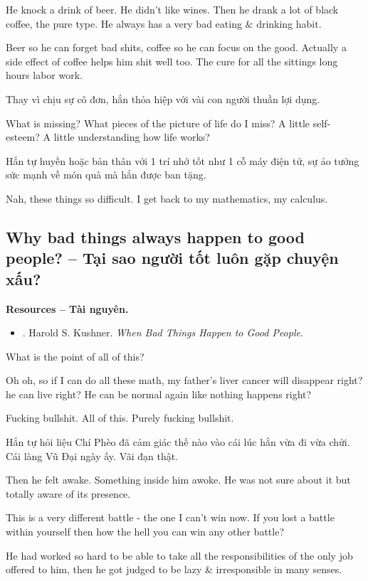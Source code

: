 \documentclass[12pt]{article}
\begin{document}
He knock a drink of beer. He didn't like wines. Then he drank a lot of black coffee, the pure type. He always has a very bad eating \& drinking habit.

Beer so he can forget bad shits, coffee so he can focus on the good. Actually a side effect of coffee helps him shit well too. The cure for all the sittings long hours labor work.

Thay vì chịu sự cô đơn, hắn thỏa hiệp với vài con người thuần lợi dụng. 

What is missing? What pieces of the picture of life do I miss? A little self-esteem? A little understanding how life works?

Hắn tự huyền hoặc bản thân với 1 trí nhớ tốt như 1 cỗ máy điện tử, sự ảo tưởng sức mạnh về món quà mà hắn được ban tặng.

Nah, these things so difficult. I get back to my mathematics, my calculus.

\subsection{Why bad things always happen to good people? -- Tại sao người tốt luôn gặp chuyện xấu?}
\textbf{\textsf{Resources -- Tài nguyên.}}
\begin{itemize}
	\item \cite{Kushner_bad_things_good_people}. {\sc Harold S. Kushner}. {\it When Bad Things Happen to Good People}.
\end{itemize}

What is the point of all of this?

Oh oh, so if I can do all these math, my father's liver cancer will disappear right? he can live right? He can be normal again like nothing happens right?

Fucking bullshit. All of this. Purely fucking bullshit.

Hắn tự hỏi liệu Chí Phèo đã cảm giác thế nào vào cái lúc hắn vừa đi vừa chửi. Cái làng Vũ Đại ngày ấy. Vãi đạn thật.


Then he felt awake. Something inside him awoke. He was not sure about it but totally aware of its presence.

This is a very different battle - the one I can't win now. If you lost a battle within yourself then how the hell you can win any other battle?

He had worked so hard to be able to take all the responsibilities of the only job offered to him, then he got judged to be lazy \& irresponsible in many senses.
\end{document}
